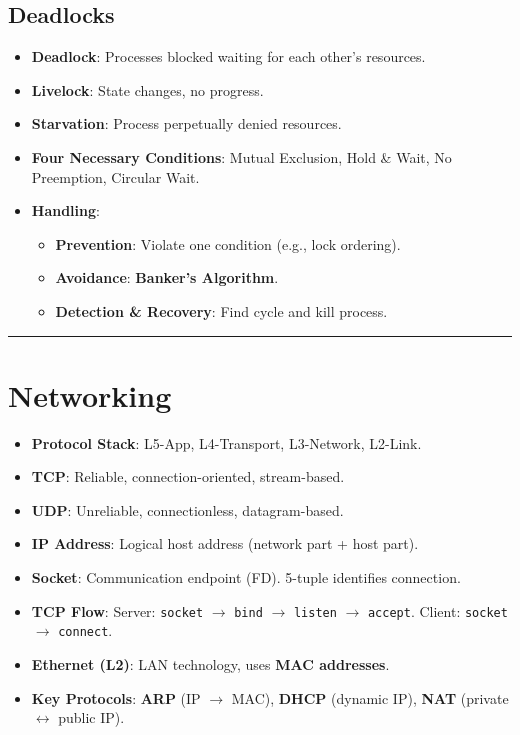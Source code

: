 \documentclass[8pt,a4paper]{article}
\newcommand{\sectiondivider}{\vspace{4pt}\hrule\vspace{4pt}}
\begin{document}
\begin{multicols}{2}
\subsection*{Deadlocks}
\begin{itemize}
    \item \textbf{Deadlock}: Processes blocked waiting for each other's resources.
    \item \textbf{Livelock}: State changes, no progress.
    \item \textbf{Starvation}: Process perpetually denied resources.
    \item \textbf{Four Necessary Conditions}: Mutual Exclusion, Hold \& Wait, No Preemption, Circular Wait.
    \item \textbf{Handling}:
    \begin{itemize}
        \item \textbf{Prevention}: Violate one condition (e.g., lock ordering).
        \item \textbf{Avoidance}: \textbf{Banker's Algorithm}.
        \item \textbf{Detection \& Recovery}: Find cycle and kill process.
    \end{itemize}
\end{itemize}


\sectiondivider
\section*{Networking}
\begin{itemize}
    \item \textbf{Protocol Stack}: L5-App, L4-Transport, L3-Network, L2-Link.
    \item \textbf{TCP}: Reliable, connection-oriented, stream-based.
    \item \textbf{UDP}: Unreliable, connectionless, datagram-based.
    \item \textbf{IP Address}: Logical host address (network part + host part).
    \item \textbf{Socket}: Communication endpoint (FD). 5-tuple identifies connection.
    \item \textbf{TCP Flow}: Server: \texttt{socket} $\to$ \texttt{bind} $\to$ \texttt{listen} $\to$ \texttt{accept}. Client: \texttt{socket} $\to$ \texttt{connect}.
    \item \textbf{Ethernet (L2)}: LAN technology, uses \textbf{MAC addresses}.
    \item \textbf{Key Protocols}: \textbf{ARP} (IP $\to$ MAC), \textbf{DHCP} (dynamic IP), \textbf{NAT} (private $\leftrightarrow$ public IP).
\end{itemize}




\end{multicols}
\end{document}
